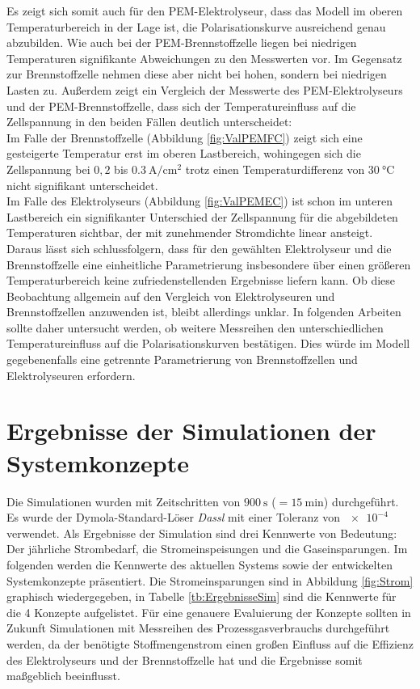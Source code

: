 Es zeigt sich somit auch für den PEM-Elektrolyseur, dass das Modell im oberen Temperaturbereich in der Lage ist, die Polarisationskurve ausreichend genau abzubilden. Wie auch bei der PEM-Brennstoffzelle liegen bei niedrigen Temperaturen signifikante Abweichungen zu den Messwerten vor. Im Gegensatz zur Brennstoffzelle nehmen diese aber nicht bei hohen, sondern bei niedrigen Lasten zu. Außerdem zeigt ein Vergleich der Messwerte des PEM-Elektrolyseurs und der PEM-Brennstoffzelle, dass sich der Temperatureinfluss auf die Zellspannung in den beiden Fällen deutlich unterscheidet:\\ 
Im Falle der Brennstoffzelle (Abbildung \ref{fig:ValPEMFC}) zeigt sich eine gesteigerte Temperatur erst im oberen Lastbereich, wohingegen sich die Zellspannung bei $0,2$ bis $\SI{0,3}{\A\per\cm\squared}$ trotz einen Temperaturdifferenz von $\SI{30}{\degreeCelsius}$ nicht signifikant unterscheidet.\\
Im Falle des Elektrolyseurs (Abbildung \ref{fig:ValPEMEC}) ist schon im unteren Lastbereich ein signifikanter Unterschied der Zellspannung für die abgebildeten Temperaturen sichtbar, der mit zunehmender Stromdichte linear ansteigt.\\

Daraus lässt sich schlussfolgern, dass für den gewählten Elektrolyseur und die Brennstoffzelle eine einheitliche Parametrierung insbesondere über einen größeren Temperaturbereich keine zufriedenstellenden Ergebnisse liefern kann. Ob diese Beobachtung allgemein auf den Vergleich von Elektrolyseuren und Brennstoffzellen anzuwenden ist, bleibt allerdings unklar. In folgenden Arbeiten sollte daher untersucht werden, ob weitere Messreihen den unterschiedlichen Temperatureinfluss auf die Polarisationskurven bestätigen. Dies würde im Modell gegebenenfalls eine getrennte Parametrierung von Brennstoffzellen und Elektrolyseuren erfordern.\\

\section{Ergebnisse der Simulationen der Systemkonzepte}
\label{sec:Ergebnisse}
Die Simulationen wurden mit Zeitschritten von $\SI{900}{\s}$ ($=\SI{15}{\minute}$) durchgeführt. Es wurde der Dymola-Standard-Löser \textit{Dassl} mit einer Toleranz von $\SI{e-4}{}$ verwendet.
Als Ergebnisse der Simulation sind drei Kennwerte von Bedeutung: Der jährliche Strombedarf, die Stromeinspeisungen und die Gaseinsparungen. Im folgenden werden die Kennwerte des aktuellen Systems sowie der entwickelten Systemkonzepte präsentiert. Die Stromeinsparungen sind in Abbildung \ref{fig:Strom} graphisch wiedergegeben, in Tabelle \ref{tb:ErgebnisseSim} sind die Kennwerte für die 4 Konzepte aufgelistet. Für eine genauere Evaluierung der Konzepte sollten in Zukunft Simulationen mit Messreihen des Prozessgasverbrauchs durchgeführt werden, da der benötigte Stoffmengenstrom einen großen Einfluss auf die Effizienz des Elektrolyseurs und der Brennstoffzelle hat und die Ergebnisse somit maßgeblich beeinflusst.\\
 
